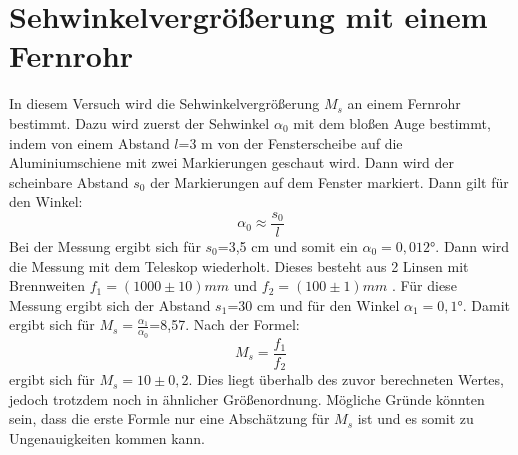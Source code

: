 \documentclass[../protokoll.tex]{subfiles}
\begin{document}
\section{Sehwinkelvergrößerung mit einem Fernrohr}
In diesem Versuch wird die Sehwinkelvergrößerung $M_s$ an einem Fernrohr bestimmt. Dazu wird zuerst der Sehwinkel $\alpha_0$ mit dem bloßen Auge bestimmt, indem von einem Abstand $l$=3 m von der Fensterscheibe auf die Aluminiumschiene mit zwei Markierungen geschaut wird. Dann wird der scheinbare Abstand $s_0$ der Markierungen auf dem Fenster markiert. Dann gilt für den Winkel:
\begin{equation}
    \alpha_0 \approx \frac{s_0}{l}
\end{equation}
Bei der Messung ergibt sich für $s_0$=3,5 cm und somit ein $\alpha_0=0,012°$.
Dann wird die Messung mit dem Teleskop wiederholt. Dieses besteht aus 2 Linsen mit Brennweiten $f_1=(1000\pm10) mm$ und $f_2=(100\pm1) mm$ .
Für diese Messung ergibt sich der Abstand $s_1$=30 cm und für den Winkel $\alpha_1=0,1°$.
Damit ergibt sich für $M_s=\frac{\alpha_1}{\alpha_0}$=8,57. Nach der Formel:
\begin{equation}
    M_s=\frac{f_1}{f_2}
\end{equation}
ergibt sich für $M_s=10\pm 0,2$. Dies liegt überhalb des zuvor berechneten Wertes, jedoch trotzdem noch in ähnlicher Größenordnung. Mögliche Gründe könnten sein, dass die erste Formle nur eine Abschätzung für $M_s$ ist und es somit zu Ungenauigkeiten kommen kann.
\end{document}
